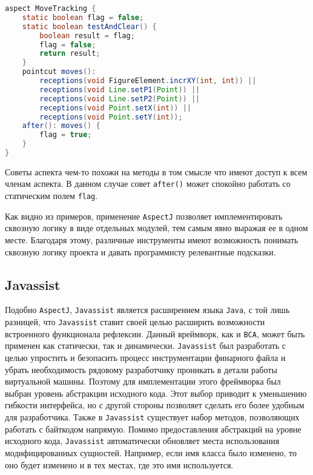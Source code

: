 \begin{lstlisting}[language=Java, caption={Аспект, отслеживающий изменения фигур.}]
aspect MoveTracking {
    static boolean flag = false;
    static boolean testAndClear() {
        boolean result = flag;
        flag = false;
        return result;
    }
    pointcut moves():
        receptions(void FigureElement.incrXY(int, int)) ||
        receptions(void Line.setP1(Point)) ||
        receptions(void Line.setP2(Point)) ||
        receptions(void Point.setX(int)) ||
        receptions(void Point.setY(int));
    after(): moves() {
        flag = true;
    }
}
\end{lstlisting}


Советы аспекта чем-то похожи на методы в том смысле что имеют доступ к всем членам аспекта. В данном случае совет \texttt{after()} может спокойно работать со статическим полем \texttt{flag}.

Как видно из примеров, применение \texttt{AspectJ} позволяет имплементировать сквозную логику в виде отдельных модулей, тем самым явно выражая ее в одном месте. Благодаря этому, различные инструменты имеют возможность понимать сквозную логику проекта и давать программисту релевантные подсказки.

\subsection{Javassist}

Подобно \texttt{AspectJ}, \texttt{Javassist} является расширением языка \texttt{Java}, с той лишь разницей, что \texttt{Javassist} ставит своей целью расширить возможности встроенного функционала рефлексии. Данный вреймворк, как и \texttt{BCA}, может быть применен как статически, так и динамически. \texttt{Javassist} был разработать с целью упростить и безопасить процесс инструментации финарного файла и убрать необходимость рядовому разработчику проникать в детали работы виртуальной машины. Поэтому для имплементации этого фреймворка был выбран уровень абстракции исходного кода. Этот выбор приводит к уменьшению гибкости интерфейса, но с другой стороны позволяет сделать его более удобным для разработчика. Также в \texttt{Javassist} существует набор методов, позволяющих работать с байткодом напрямую. Помимо предоставления абстракций на уровне исходного кода, \texttt{Javassist} автоматически обновляет места использования модифицированных сущностей. Например, если имя класса было изменено, то оно будет изменено и в тех местах, где это имя используется.

